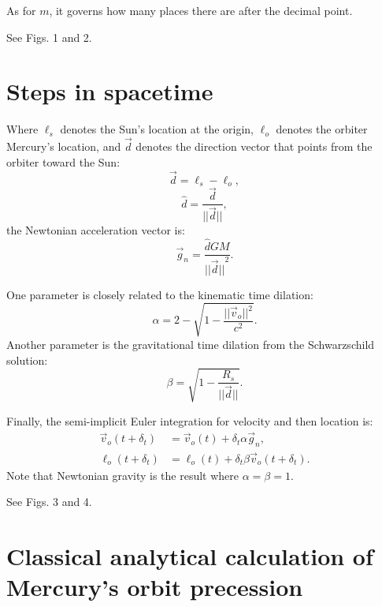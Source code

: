 \documentclass[12pt]{article}
\begin{document}
As for $m$, it governs how many places there are after the decimal point.

See Figs. 1 and 2.


\section{Steps in spacetime}

Where $\ell_s$ denotes the Sun's location at the origin, $\ell_o$ denotes the orbiter Mercury's location, and $\vec{d}$ denotes the direction vector that points from the orbiter toward the Sun:
\begin{equation}
\label{direction_vector}
\vec{d} = \ell_{s} - \ell_{o},	
\end{equation}
\begin{equation}
\label{direction_unit_vector}
\hat{d} = \frac{\vec{d}}{\lvert\lvert \vec{d} \rvert\rvert},
\end{equation}
the Newtonian acceleration vector is:
\begin{equation}
\label{newton}
\vec{g}_n = \frac{\hat{d} G M}{{\lvert\lvert \vec{d} \rvert\rvert}^2}.
\end{equation}

One parameter is closely related to the kinematic time dilation:
\begin{equation}
\label{eq_kinematic}
\alpha = 2 - \sqrt{1 - \frac{\lvert\lvert \vec{v}_{o}\rvert\rvert^2}{c^2}}.
\end{equation}
Another parameter is the gravitational time dilation from the Schwarzschild solution:
\begin{equation}
\label{eq_gravitational}
\beta = \sqrt{1 - \frac{R_{s}}{\lvert \lvert \vec{d} \rvert \rvert}}.
\end{equation}

Finally, the semi-implicit Euler integration for velocity and then location is:
\begin{align}
\label{eq_velocity}
\vec{v}_{o}(t + \delta_t) &= \vec{v}_{o}(t) + \delta_{t} \alpha \vec{g}_n, \\
\label{eq_position}
\ell_{o}(t + \delta_t) &= \ell_{o}(t) + \delta_{t} \beta \vec{v}_{o}(t + \delta_t).
\end{align}
Note that Newtonian gravity is the result where $\alpha = \beta = 1$.

See Figs. 3 and 4.





\section{Classical analytical calculation of Mercury's orbit precession}
\end{document}
